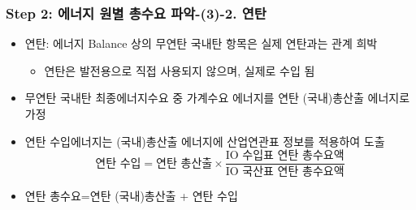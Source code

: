 \documentclass[10pt,compress,slidetop,%
			   hyperref={unicode},xcolor={svgnames},%
			   t]{beamer}
\begin{document}
\begin{frame}
	\frametitle{Step 2: 에너지 원별 총수요 파악-(3)-2. 연탄}
\bigskip
		\begin{itemize}
	\item{연탄: 에너지 Balance 상의 무연탄 국내탄 항목은 실제 연탄과는 관계 희박}
		\begin{itemize}
		\item{연탄은 발전용으로 직접 사용되지 않으며, 실제로 수입 됨}
		\end{itemize}
\bigskip
		\item{무연탄 국내탄 최종에너지수요 중 가계수요 에너지를 연탄 (국내)총산출 에너지로 가정}
\bigskip
		\item{연탄 수입에너지는 (국내)총산출 에너지에 산업연관표 정보를 적용하여 도출}
			\begin{displaymath}
			\mbox{연탄 수입} =\mbox{연탄 총산출}\times\frac{\mbox{IO 수입표 연탄 총수요액}}{\mbox{IO 국산표 연탄 총수요액}} 
			\end{displaymath}		
\bigskip
		\item{연탄 총수요=연탄 (국내)총산출 + 연탄 수입}
	\end{itemize} 	
	
	
\end{frame}
%
\end{document}
